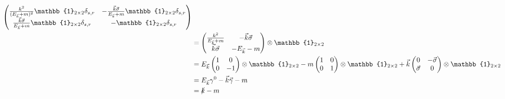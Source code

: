 \documentclass{article}
\begin{document}
\begin{align*}
\begin{pmatrix}
		\frac{k^2}{(E_{\vec{k}} + m)^2 } \mathbb{1}_{2\times2}\delta_{s,r}           & - \frac{\vec{k}\vec{\sigma}}{E_{\vec{k}} + m} \mathbb{1}_{2\times2}\delta_{s,r} \\
		\frac{\vec{k}\vec{\sigma}}{E_{\vec{k}} + m}\mathbb{1}_{2\times2}\delta_{s,r} & -\mathbb{1}_{2\times2}\delta_{s,r}
	\end{pmatrix}                                                                                                                                                                           \\
	 & =
	\begin{pmatrix}
		\frac{k^2}{E_{\vec{k}} + m} & -\vec{k}\vec{\sigma} \\
		\vec{k}\vec{\sigma}         & -E_{\vec{k}} - m
	\end{pmatrix}
	\otimes \mathbb{1}_{2\times2}                                                                                                                                                                                                                                                                                                                                                                          \\
	 & = E_{\vec{k}}
	\begin{pmatrix}
		1 & 0  \\
		0 & -1
	\end{pmatrix} \otimes \mathbb{1}_{2\times2}
	- m\begin{pmatrix}
		   1 & 0 \\
		   0 & 1
	   \end{pmatrix} \otimes \mathbb{1}_{2\times2}
	+ \vec{k} \begin{pmatrix}
		          0            & -\vec{\sigma} \\
		          \vec{\sigma} & 0
	          \end{pmatrix}\otimes \mathbb{1}_{2\times2}                                                                                                                                                                                                                                                                                                                                                   \\
	 & = E_{\vec{k}} \gamma^0 - \vec{k}\vec{\gamma} - m                                                                                                                                                                                                                                                                                                                                                    \\
	 & = \slashed{k} - m
\end{align*}
\end{document}
